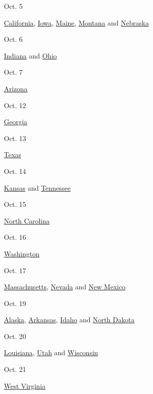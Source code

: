 Oct. 5

\href{https://www.sos.ca.gov/elections}{California},
\href{https://sos.iowa.gov/elections/voterinformation/index.html}{Iowa},
\href{https://www.maine.gov/sos/cec/elec/}{Maine},
\href{https://sosmt.gov/elections/}{Montana} and
\href{https://www.nebraska.gov/featured/elections-voting/}{Nebraska}

Oct. 6

\href{https://www.in.gov/sos/elections/}{Indiana} and
\href{https://www.ohiosos.gov/elections/}{Ohio}

Oct. 7

\href{https://azsos.gov/elections}{Arizona}

Oct. 12

\href{https://sos.ga.gov/index.php/?section=elections}{Georgia}

Oct. 13

\href{https://www.sos.state.tx.us/elections/laws/advisory2020-17.shtml\#October19}{Texas}

Oct. 14

\href{https://sos.ks.gov/elections/elections.html}{Kansas} and
\href{https://sos.tn.gov/products/elections/2020-election-calendar}{Tennessee}

Oct. 15

\href{https://www.ncsbe.gov/voting/vote-early-person}{North Carolina}

Oct. 16

\href{https://www.sos.wa.gov/elections/}{Washington}

Oct. 17

\href{https://www.sec.state.ma.us/ele/eleidx.htm}{Massachusetts},
\href{https://www.nvsos.gov/sos/elections}{Nevada} and
\href{https://www.sos.state.nm.us/voting-and-elections/voter-information-portal/absentee-and-early-voting/}{New
Mexico}

Oct. 19

\href{https://www.elections.alaska.gov/Core/absenteeearlyandinpersonvoting.php}{Alaska},
\href{https://www.sos.arkansas.gov/elections}{Arkansas},
\href{https://sos.idaho.gov/elections-division/}{Idaho} and
\href{https://vip.sos.nd.gov/PortalList.aspx}{North Dakota}

Oct. 20

\href{https://www.sos.la.gov/electionsandvoting/Pages/default.aspx}{Louisiana},
\href{https://elections.utah.gov/}{Utah} and
\href{https://elections.wi.gov/}{Wisconsin}

Oct. 21

\href{https://sos.wv.gov/elections/Pages/default.aspx}{West Virginia}

